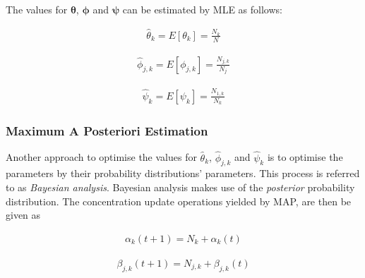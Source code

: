 The values for $\boldsymbol{\theta}$, $\boldsymbol{\phi}$ and $\boldsymbol{\psi}$ can be estimated by \acs{MLE} as follows:

\begin{equation}
	\label{eq:bhh:optimisation_step:mle:theta}
	\begin{split}
		\hat{\theta}_{k} = E[\theta_{k}] = \frac{N_{k}}{N}
	\end{split}
\end{equation}

\begin{equation}
	\label{eq:bhh:optimisation_step:mle:phi}
	\begin{split}
		\hat{\phi}_{j,k} = E[\phi_{j,k}] = \frac{N_{j,k}}{N_{j}}
	\end{split}
\end{equation}

\begin{equation}
	\label{eq:bhh:optimisation_step:mle:psi}
	\begin{split}
		\hat{\psi}_{k} = E[\psi_{k}] = \frac{N_{1,k}}{N_{k}}
	\end{split}
\end{equation}


\subsubsection{Maximum A Posteriori Estimation}\label{sec:bhh:optimisation_step:map}

Another approach to optimise the values for $\hat{\theta}_{k}$, $\hat{\phi}_{j,k}$ and $\hat{\psi}_{k}$ is to optimise the parameters by their probability distributions' parameters. This process is referred to as \textit{Bayesian analysis}. Bayesian analysis makes use of the \textit{posterior} probability distribution. The concentration update operations yielded by \acs{MAP}, are then be given as

\begin{equation}
	\label{eq:bhh:optimisation_step:map:alpha_update_operation}
	\begin{split}
		\alpha_{k}(t+1) = N_{k} + \alpha_{k}(t)
	\end{split}
\end{equation}

\begin{equation}
	\label{eq:bhh:optimisation_step:map:beta_update_operation}
	\begin{split}
		\beta_{j,k}(t+1) = N_{j,k} + \beta_{j,k}(t)
	\end{split}
\end{equation}

